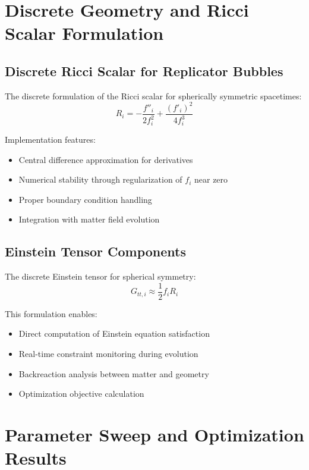 \documentclass[11pt]{article}
\begin{document}
\section{Discrete Geometry and Ricci Scalar Formulation}

\subsection{Discrete Ricci Scalar for Replicator Bubbles}

The discrete formulation of the Ricci scalar for spherically symmetric spacetimes:
\begin{equation}
R_i = -\frac{f''_i}{2f_i^2} + \frac{(f'_i)^2}{4f_i^3}
\end{equation}

Implementation features:
\begin{itemize}
\item Central difference approximation for derivatives
\item Numerical stability through regularization of $f_i$ near zero
\item Proper boundary condition handling
\item Integration with matter field evolution
\end{itemize}

\subsection{Einstein Tensor Components}

The discrete Einstein tensor for spherical symmetry:
\begin{equation}
G_{tt,i} \approx \frac{1}{2}f_i R_i
\end{equation}

This formulation enables:
\begin{itemize}
\item Direct computation of Einstein equation satisfaction
\item Real-time constraint monitoring during evolution
\item Backreaction analysis between matter and geometry
\item Optimization objective calculation
\end{itemize}

\section{Parameter Sweep and Optimization Results}
\end{document}
